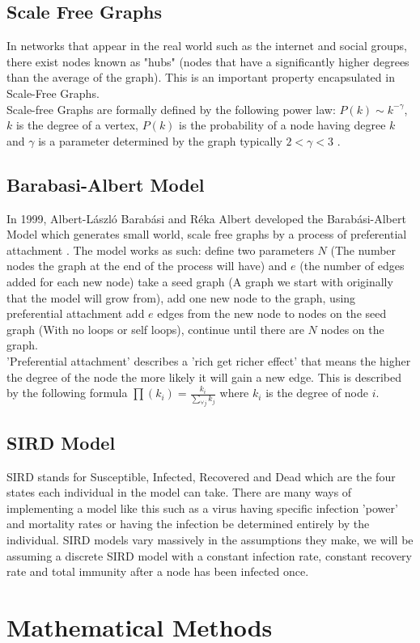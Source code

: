 \documentclass{article}
\begin{document}
        \subsection{Scale Free Graphs}
        In networks that appear in the real world such as the internet and social groups, there exist nodes known as "hubs"  (nodes that have a significantly higher degrees than the average of the graph). This is an important property encapsulated in Scale-Free Graphs.\\ 
        Scale-free Graphs are formally defined by the following power law: $P(k) \sim  k^{-\gamma }$, $k$ is the degree of a vertex, $P(k)$ is the probability of a node having degree $k$ and $\gamma$ is a parameter determined by the graph typically $2<\gamma<3$ \parencite{onnela2007structure}.

        \subsection{Barabasi-Albert Model}
        In 1999, Albert-László Barabási and Réka Albert developed the Barabási-Albert Model which generates small world, scale free graphs by a process of preferential attachment \parencite{barabasi1999emergence}. The model works as such: define two parameters $N$ (The number nodes the graph at the end of the process will have) and $e$ (the number of edges added for each new node) take a seed graph (A graph we start with originally that the model will grow from), add one new node to the graph, using preferential attachment add $e$ edges from the new node to nodes on the seed graph (With no loops or self loops), continue until there are $N$ nodes on the graph.\\
        'Preferential attachment' describes a 'rich get richer effect' that means the higher the degree of the node the more likely it will gain a new edge. This is described by the following formula $\prod (k_{i}) = \frac{k_{i}}{\sum_{\forall j} {k_{j}}}$ where $k_{i}$ is the degree of node $i$. 
        \subsection{SIRD Model}
        SIRD stands for Susceptible, Infected, Recovered and Dead which are the four states each individual in the model can take. There are many ways of implementing a model like this such as a virus having specific infection 'power' and mortality rates or having the infection be determined entirely by the individual. SIRD models vary massively in the assumptions they make, we will be assuming a discrete SIRD model with a constant infection rate, constant recovery rate and total immunity after a node has been infected once.    \section{Mathematical Methods}
\end{document}
